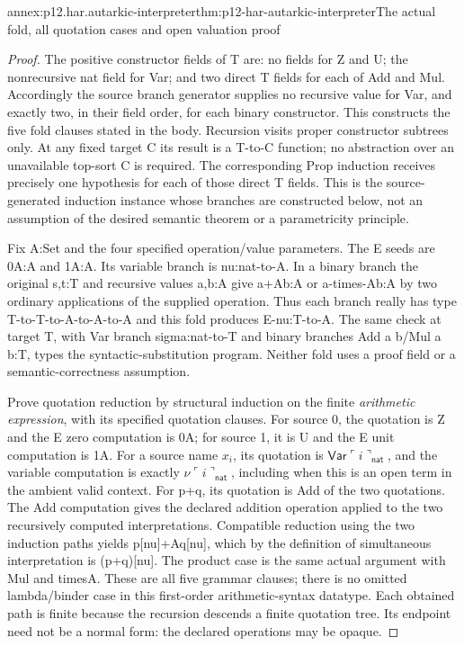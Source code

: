 \begin{annexitem}{annex:p12.har.autarkic-interpreter}{thm:p12-har-autarkic-interpreter}{The actual fold, all quotation cases and open valuation proof}
\begin{proof}
The positive constructor fields of T are: no fields for Z and U;
the nonrecursive nat field for Var; and two direct T fields for
each of Add and Mul. Accordingly the source branch generator supplies
no recursive value for Var, and exactly two, in their field order,
for each binary constructor. This constructs the five fold clauses
stated in the body. Recursion visits proper constructor subtrees only.
At any fixed target C its result is a T-to-C function; no abstraction
over an unavailable top-sort C is required. The corresponding Prop
induction receives precisely one hypothesis for each of those direct
T fields. This is the source-generated induction instance whose
branches are constructed below, not an assumption of the desired
semantic theorem or a parametricity principle.

Fix A:Set and the four specified operation/value parameters.
The E seeds are 0A:A and 1A:A. Its variable branch is
nu:nat-to-A. In a binary branch the original s,t:T and recursive
values a,b:A give a+Ab:A or a-times-Ab:A by two ordinary
applications of the supplied operation. Thus each branch really
has type T-to-T-to-A-to-A-to-A and this fold produces E-nu:T-to-A.
The same check at target T, with Var branch sigma:nat-to-T and
binary branches Add a b/Mul a b:T, types the syntactic-substitution
program. Neither fold uses a proof field or a semantic-correctness
assumption.

Prove quotation reduction by structural induction on the finite
\emph{arithmetic expression}, with its specified quotation clauses.
For source 0, the quotation is Z and the E zero computation is 0A;
for source 1, it is U and the E unit computation is 1A. For a source
name \(x_i\), its quotation is
\(\mathsf{Var}\ulcorner i\urcorner_{\mathsf{nat}}\), and the
variable computation is exactly
\(\nu\ulcorner i\urcorner_{\mathsf{nat}}\),
including when this is an open term in the ambient valid context.
For p+q, its quotation is Add of the two quotations. The Add
computation gives the declared addition operation applied to the
two recursively computed interpretations. Compatible reduction using
the two induction paths yields p[nu]+Aq[nu], which by the definition
of simultaneous interpretation is (p+q)[nu]. The product case is
the same actual argument with Mul and timesA. These are all five
grammar clauses; there is no omitted lambda/binder case in this
first-order arithmetic-syntax datatype. Each obtained path is finite
because the recursion descends a finite quotation tree. Its endpoint
need not be a normal form: the declared operations may be opaque.


\end{proof}
\end{annexitem}
